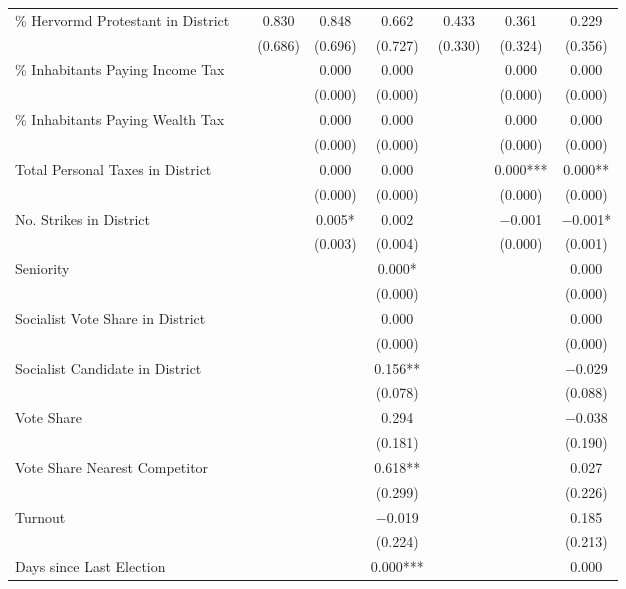 \begin{table}[!h]
{\begin{threeparttable}
\begin{tabular}[t]{lccccccc}
\% Hervormd Protestant in District &  & \num{0.830} & \num{0.848} & \num{0.662} & \num{0.433} & \num{0.361} & \num{0.229}\\
 &  & (\num{0.686}) & (\num{0.696}) & (\num{0.727}) & (\num{0.330}) & (\num{0.324}) & (\num{0.356})\\
\% Inhabitants Paying Income Tax &  &  & \num{0.000} & \num{0.000} &  & \num{0.000} & \num{0.000}\\
 &  &  & (\num{0.000}) & (\num{0.000}) &  & (\num{0.000}) & \vphantom{2} (\num{0.000})\\
\% Inhabitants Paying Wealth Tax &  &  & \num{0.000} & \num{0.000} &  & \num{0.000} & \num{0.000}\\
 &  &  & (\num{0.000}) & (\num{0.000}) &  & (\num{0.000}) & \vphantom{1} (\num{0.000})\\
Total Personal Taxes in District &  &  & \num{0.000} & \num{0.000} &  & \num{0.000}*** & \num{0.000}**\\
 &  &  & (\num{0.000}) & (\num{0.000}) &  & (\num{0.000}) & (\num{0.000})\\
No. Strikes in District &  &  & \num{0.005}* & \num{0.002} &  & \num{-0.001} & \num{-0.001}*\\
 &  &  & (\num{0.003}) & (\num{0.004}) &  & (\num{0.000}) & (\num{0.001})\\
Seniority &  &  &  & \num{0.000}* &  &  & \num{0.000}\\
 &  &  &  & (\num{0.000}) &  &  & \vphantom{2} (\num{0.000})\\
Socialist Vote Share in District &  &  &  & \num{0.000} &  &  & \num{0.000}\\
 &  &  &  & (\num{0.000}) &  &  & \vphantom{1} (\num{0.000})\\
Socialist Candidate in District &  &  &  & \num{0.156}** &  &  & \num{-0.029}\\
 &  &  &  & (\num{0.078}) &  &  & (\num{0.088})\\
Vote Share &  &  &  & \num{0.294} &  &  & \num{-0.038}\\
 &  &  &  & (\num{0.181}) &  &  & (\num{0.190})\\
Vote Share Nearest Competitor &  &  &  & \num{0.618}** &  &  & \num{0.027}\\
 &  &  &  & (\num{0.299}) &  &  & (\num{0.226})\\
Turnout &  &  &  & \num{-0.019} &  &  & \num{0.185}\\
 &  &  &  & (\num{0.224}) &  &  & (\num{0.213})\\
Days since Last Election &  &  &  & \num{0.000}*** &  &  & \num{0.000}\\

\end{tabular}
\end{threeparttable}}
\end{table}
